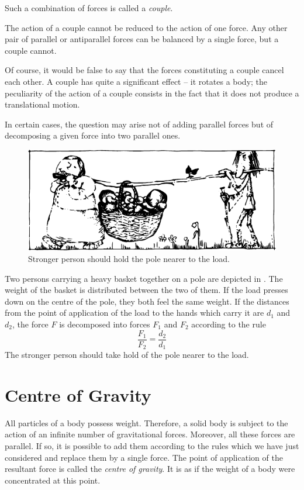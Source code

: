 Such a combination of forces is called a \emph{couple}.

The action of a couple cannot be reduced to the action
of one force. Any other pair of parallel or antiparallel
forces can be balanced by a single force, but a couple
cannot.

Of course, it would be false to say that the forces constituting a couple cancel each other. A couple has quite a
significant effect -- it rotates a body; the peculiarity of the action of a couple consists in the fact that it does not
produce a translational motion.

In certain cases, the question may arise not of adding
parallel forces but of decomposing a given force into two
parallel ones.
 \begin{figure}[!ht]
 \centering
 \includegraphics[width=\textwidth]{figures/fig-5-08.pdf}
 \caption{Stronger person should hold the pole nearer to the load.}
 \label{fig-5-08}
 \end{figure}

Two persons carrying a heavy basket together on a
pole are depicted in . The weight of the basket
is distributed between the two of them. If the load presses
down on the centre of the pole, they both feel the same
weight. If the distances from the point of application
of the load to the hands which carry it are $d_{1}$ and $d_{2}$, the
force $F$ is decomposed into forces $F_{1}$ and $F_{2}$ according to
the rule
 \begin{equation*}%
 \dfrac{F_{1}}{F_{2}} = \dfrac{d_{2}}{d_{1}}
 \end{equation*}
The stronger person should take hold of the pole nearer
to the load.

\section{Centre of Gravity}

All particles of a body possess weight. Therefore, a solid body is subject to the action of an infinite number of gravitational forces. Moreover, all these forces are parallel. If so, it is possible to add them according to the rules which we have just considered and replace them by a single force. The point of application of the resultant force is called the \emph{centre of gravity}. It is as if the weight
of a body were concentrated at this point.

